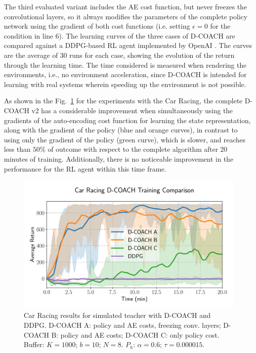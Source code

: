 The third evaluated variant includes the AE cost function, but never freezes the convolutional layers, so it always modifies the parameters of the complete policy network using the gradient of both cost functions (i.e. setting $\epsilon=0$ for the condition in line 6). The learning curves of the three cases of D-COACH are compared against a DDPG-based RL agent \cite{Lillicrap2015} implemented by OpenAI \cite{baselines}. The curves are the average of 30 runs for each case, showing the evolution of the return through the learning time. The time considered is measured when rendering the environments, i.e., no environment acceleration, since D-COACH is intended for learning with real systems wherein speeding up the environment is not possible.

As shown in the Fig.~\ref{fig:simulatedteachers} for the experiments with the Car Racing, the complete D-COACH v2 has a considerable improvement when simultaneously using the gradients of the auto-encoding cost function for learning the state representation, along with the gradient of the policy  (blue and orange curves), in contrast to using only the gradient of the policy (green curve), which is slower, and reaches less than $50\%$ of outcome with respect to the complete algorithm after 20 minutes of training. Additionally, there is no noticeable improvement in the performance for the RL agent within this time frame.

\begin{figure}[h]
    \centering
    \includegraphics[width=0.9\linewidth]{imagenes/cap3/car_racing_sim_ICRA.pdf}
    \caption{Car Racing results for simulated teacher with D-COACH and DDPG. D-COACH A: policy and AE costs, freezing conv. layers; D-COACH B: policy and AE costs; D-COACH C: only policy cost. Buffer: $K = 1000$; $b = 10$; $N = 8$. $P_{h}$: $\alpha = 0.6$; $\tau = 0.000015$.}
    \label{fig:simulatedteachers}
\end{figure}

